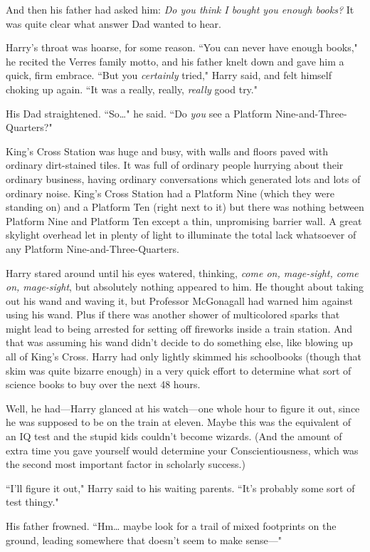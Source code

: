 And then his father had asked him: \emph{Do you think I bought you enough books?} It was quite clear what answer Dad wanted to hear.

Harry's throat was hoarse, for some reason. ``You can never have enough books," he recited the Verres family motto, and his father knelt down and gave him a quick, firm embrace. ``But you \emph{certainly} tried," Harry said, and felt himself choking up again. ``It was a really, really, \emph{really} good try."

His Dad straightened. ``So{\ldots}" he said. ``Do \emph{you} see a Platform Nine-and-Three-Quarters?"

King's Cross Station was huge and busy, with walls and floors paved with ordinary dirt-stained tiles. It was full of ordinary people hurrying about their ordinary business, having ordinary conversations which generated lots and lots of ordinary noise. King's Cross Station had a Platform Nine (which they were standing on) and a Platform Ten (right next to it) but there was nothing between Platform Nine and Platform Ten except a thin, unpromising barrier wall. A great skylight overhead let in plenty of light to illuminate the total lack whatsoever of any Platform Nine-and-Three-Quarters.

Harry stared around until his eyes watered, thinking, \emph{come on, mage-sight, come on, mage-sight}, but absolutely nothing appeared to him. He thought about taking out his wand and waving it, but Professor McGonagall had warned him against using his wand. Plus if there was another shower of multicolored sparks that might lead to being arrested for setting off fireworks inside a train station. And that was assuming his wand didn't decide to do something else, like blowing up all of King's Cross. Harry had only lightly skimmed his schoolbooks (though that skim was quite bizarre enough) in a very quick effort to determine what sort of science books to buy over the next 48 hours.

Well, he had—Harry glanced at his watch—one whole hour to figure it out, since he was supposed to be on the train at eleven. Maybe this was the equivalent of an IQ test and the stupid kids couldn't become wizards. (And the amount of extra time you gave yourself would determine your Conscientiousness, which was the second most important factor in scholarly success.)

``I'll figure it out," Harry said to his waiting parents. ``It's probably some sort of test thingy."

His father frowned. ``Hm{\ldots} maybe look for a trail of mixed footprints on the ground, leading somewhere that doesn't seem to make sense—"


